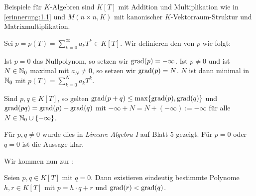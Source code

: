 Beispiele für $K$-Algebren sind $K[T]$ mit Addition und Multiplikation wie in \ref{erinnerung:1.1} und $M(n\times n,K)$ mit kanonischer $K$-Vektorraum-Struktur und Matrixmultiplikation.

\begin{definition}[Grad]
	\label{def:1.3}
	Sei $p = p(T) = \sum_{k=0}^{\infty} a_k T^{k} \in K[T]$.
	Wir definieren den  von $p$ wie folgt:
	
	Ist $p = 0$ das Nullpolynom, so setzen wir $\operatorname{grad}(p) = -\infty$.
	Ist $p \neq 0$ und ist $N \in \mathbb{N}_0$ maximal mit $a_N \neq 0$, so setzen wir $\operatorname{grad}(p) = N$.
	$N$ ist dann minimal in $\mathbb{N}_0$ mit $p(T) = \sum_{k=0}^{N} a_k T^{k}$.
\end{definition}

\begin{lemma}
	\label{lemma:1.4}
	Sind $p,q \in K[T]$, so gelten $\operatorname{grad}(p+q) \leq \max\{\operatorname{grad}(p),\operatorname{grad}(q)\}$ und $\operatorname{grad}(pq) = \operatorname{grad}(p)+\operatorname{grad}(q)$ mit $-\infty + N = N + (-\infty) := -\infty$ für alle $N \in \mathbb{N}_0 \cup \{-\infty\}$.
\end{lemma}

\begin{beweis}
	Für $p,q \neq 0$ wurde dies in \textit{Lineare Algebra I} auf Blatt 5 gezeigt.
	Für $p = 0$ oder $q=0$ ist die Aussage klar. \qedhere
\end{beweis}

Wir kommen nun zur :
\begin{satz}
	\label{satz:1.5}
	Seien $p,q \in K[T]$ mit $q=0$.
	Dann existieren eindeutig bestimmte Polynome $h,r \in K[T]$ mit $p=h\cdot q+r$ und $\operatorname{grad}(r) < \operatorname{grad}(q)$.
\end{satz}

